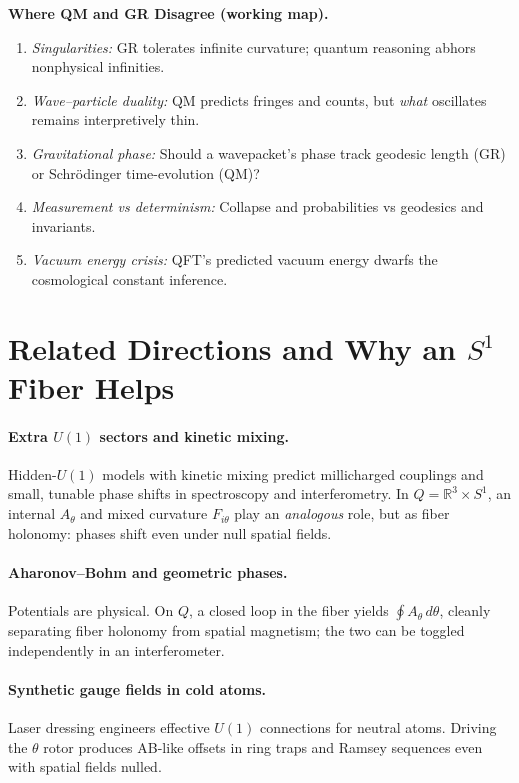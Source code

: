 \noindent
\textbf{Where QM and GR Disagree (working map).}
\begin{enumerate}\itemsep4pt
  \item \textit{Singularities:} GR tolerates infinite curvature; quantum reasoning abhors nonphysical infinities.
  \item \textit{Wave--particle duality:} QM predicts fringes and counts, but \emph{what} oscillates remains interpretively thin.
  \item \textit{Gravitational phase:} Should a wavepacket’s phase track geodesic length (GR) or Schrödinger time-evolution (QM)?
  \item \textit{Measurement vs determinism:} Collapse and probabilities vs geodesics and invariants.
  \item \textit{Vacuum energy crisis:} QFT’s predicted vacuum energy dwarfs the cosmological constant inference.
\end{enumerate}

\section{Related Directions and Why an $S^1$ Fiber Helps}
\label{sec:related}
\paragraph{Extra $U(1)$ sectors and kinetic mixing.}
Hidden-$U(1)$ models with kinetic mixing predict millicharged couplings and small, tunable phase shifts in
spectroscopy and interferometry. In $Q=\mathbb{R}^3\times S^1$, an internal $A_\theta$ and mixed curvature $F_{i\theta}$
play an \emph{analogous} role, but as fiber holonomy: phases shift even under null spatial fields.

\paragraph{Aharonov--Bohm and geometric phases.}
Potentials are physical. On $Q$, a closed loop in the fiber yields $\oint A_\theta\,d\theta$, cleanly separating
fiber holonomy from spatial magnetism; the two can be toggled independently in an interferometer.

\paragraph{Synthetic gauge fields in cold atoms.}
Laser dressing engineers effective $U(1)$ connections for neutral atoms. Driving the $\theta$ rotor produces AB-like
offsets in ring traps and Ramsey sequences even with spatial fields nulled.

